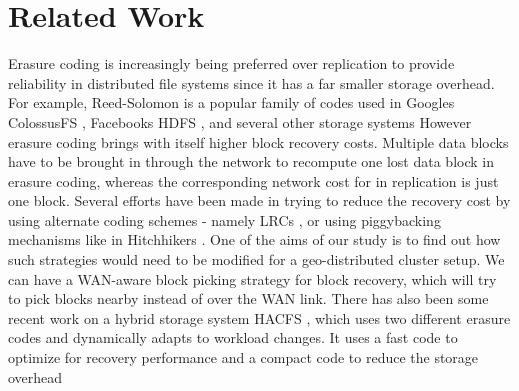 \documentclass{sig-alternate-05-2015}
\begin{document}
\section{Related Work}
Erasure coding is increasingly being preferred over replication to provide reliability in distributed file systems since it has a far smaller storage overhead. For example, Reed-Solomon \cite{RS} is a popular family of codes used in Google\textquotesingle s ColossusFS \cite{colossus}, Facebook\textquotesingle s HDFS \cite{hdfs-raid}, and several other storage systems \cite{rethink, hitchhiker, gpfs}
However erasure coding brings with itself higher block recovery costs. Multiple data blocks have to be brought in through the network to recompute one lost data block in erasure coding, whereas the corresponding network cost for in replication is just one block.  Several efforts have been made in trying to reduce the recovery cost by using alternate coding schemes - namely LRCs \cite{azure}, or using piggybacking mechanisms like in Hitchhiker\textquotesingle s \cite{hitchhiker}. One of the aims of our study is to find out how such strategies would need to be modified for a geo-distributed cluster setup. We can have a WAN-aware block picking strategy for block recovery, which will try to pick blocks nearby instead of over the WAN link.
There has also been some recent work on a hybrid storage system HACFS \cite{tale}, which uses two different erasure codes and dynamically adapts to workload changes. It uses a fast code to optimize for recovery performance and a compact code to reduce the storage overhead



\end{document}
